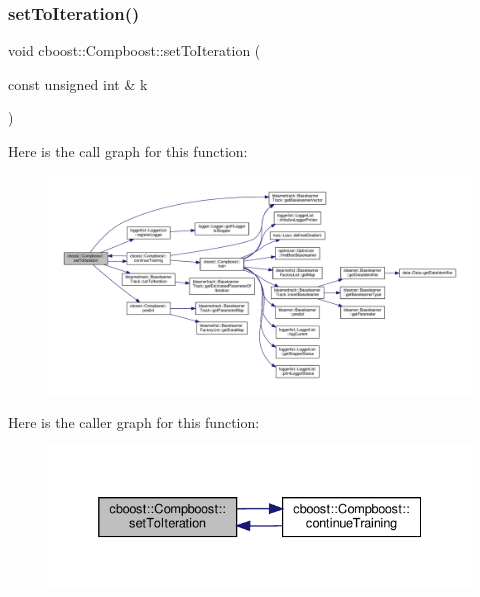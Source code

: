 \subsubsection{\texorpdfstring{set\+To\+Iteration()}{setToIteration()}}
{\footnotesize\ttfamily void cboost\+::\+Compboost\+::set\+To\+Iteration (\begin{DoxyParamCaption}\item[{const unsigned int \&}]{k }\end{DoxyParamCaption})}

Here is the call graph for this function\+:\nopagebreak
\begin{figure}[H]
\begin{center}
\leavevmode
\includegraphics[width=350pt]{classcboost_1_1_compboost_ad1ee3b88f585f38255d827dceb4b7659_cgraph}
\end{center}
\end{figure}
Here is the caller graph for this function\+:\nopagebreak
\begin{figure}[H]
\begin{center}
\leavevmode
\includegraphics[width=332pt]{classcboost_1_1_compboost_ad1ee3b88f585f38255d827dceb4b7659_icgraph}
\end{center}
\end{figure}
\mbox{\label{classcboost_1_1_compboost_a7be8cb767054ece895d535c1f468233e}} 
